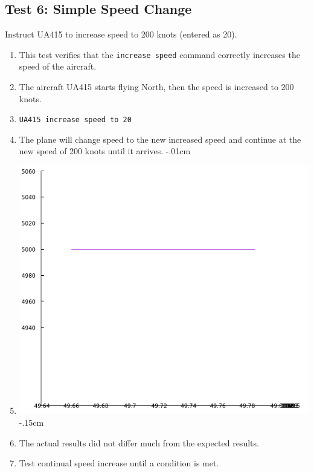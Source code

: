 \documentclass[letterpaper, 12pt]{article}
\begin{document}
\subsection{Test 6: Simple Speed Change}
Instruct UA415 to increase speed to 200 knots (entered as 20).
\begin{enumerate}\itemsep-.15cm
\item This test verifies that the \verb!increase speed! command correctly increases the speed of the aircraft.
\item The aircraft UA415 starts flying North, then the speed is increased to 200 knots.
\item \verb!UA415 increase speed to 20!
\item The plane will change speed to the new increased speed and continue at the new speed of 200 knots until it arrives.
\itemsep-.01cm
\item \includegraphics[scale=.45,valign=t,center]{test6.png}
\itemsep-.15cm
\item The actual results did not differ much from the expected results.
\item Test continual speed increase until a condition is met.
\end{enumerate}
\end{document}
